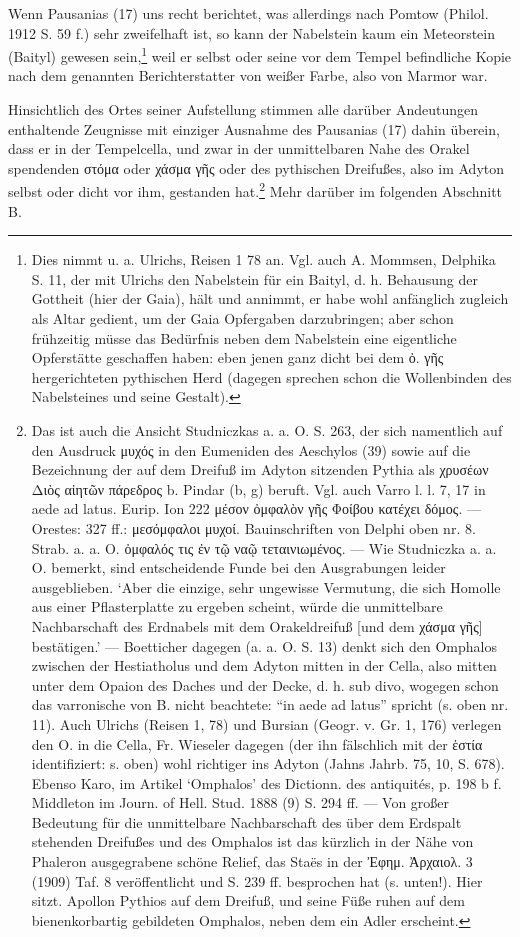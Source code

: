 \documentclass[a4paper, 11pt, oneside]{article}
\begin{document}
Wenn Pausanias (17) uns recht berichtet, was allerdings nach Pomtow (Philol. 1912 S. 59 f.) sehr zweifelhaft ist, so kann der Nabelstein kaum ein Meteorstein (Baityl) gewesen sein,\footnote{Dies nimmt u. a. Ulrichs, Reisen 1 78 an. Vgl. auch A. Mommsen, Delphika S. 11, der mit Ulrichs den Nabelstein für ein Baityl, d. h. Behausung der Gottheit (hier der Gaia), hält und annimmt, er habe wohl anfänglich zugleich als Altar gedient, um der Gaia Opfergaben darzubringen; aber schon frühzeitig müsse das Bedürfnis neben dem Nabelstein eine eigentliche Opferstätte geschaffen haben: eben jenen ganz dicht bei dem ὀ. γῆς hergerichteten pythischen Herd (dagegen sprechen schon die Wollenbinden des Nabelsteines und seine Gestalt).} weil er selbst oder seine vor dem Tempel befindliche Kopie nach dem genannten Berichterstatter von weißer Farbe, also von Marmor war.

Hinsichtlich des Ortes seiner Aufstellung stimmen alle darüber Andeutungen enthaltende Zeugnisse mit einziger Ausnahme des Pausanias (17) dahin überein, dass er in der Tempelcella, und zwar in der unmittelbaren Nahe des Orakel spendenden στόμα oder χάσμα γῆς oder des pythischen Dreifußes, also im Adyton selbst oder dicht vor ihm, gestanden hat.\footnote{Das ist auch die Ansicht Studniczkas a. a. O. S. 263, der sich namentlich auf den Ausdruck μυχός in den Eumeniden des Aeschylos (39) sowie auf die Bezeichnung der auf dem Dreifuß im Adyton sitzenden Pythia als χρυσέων Διὸς αἰητῶν πάρεδρος b. Pindar (b, g) beruft. Vgl. auch Varro l. l. 7, 17 in aede ad latus. Eurip. Ion 222 μέσον ὀμφαλὸν γῆς Φοίβου κατέχει δόμος. --- Orestes: 327 ff.: μεσόμφαλοι μυχοί. Bauinschriften von Delphi oben nr. 8. Strab. a. a. O. ὀμφαλός τις ἐν τῷ ναῷ τεταινιωμένος. --- Wie Studniczka a. a. O. bemerkt, sind entscheidende Funde bei den Ausgrabungen leider ausgeblieben. `Aber die einzige, sehr ungewisse Vermutung, die sich Homolle aus einer Pflasterplatte zu ergeben scheint, würde die unmittelbare Nachbarschaft des Erdnabels mit dem Orakeldreifuß [und dem χάσμα γῆς] bestätigen.' --- Boetticher dagegen (a. a. O. S. 13) denkt sich den Omphalos zwischen der Hestiatholus und dem Adyton mitten in der Cella, also mitten unter dem Opaion des Daches und der Decke, d. h. sub divo, wogegen schon das varronische von B. nicht beachtete: "`in aede ad latus"' spricht (s. oben nr. 11). Auch Ulrichs (Reisen 1, 78) und Bursian (Geogr. v. Gr. 1, 176) verlegen den O. in die Cella, Fr. Wieseler dagegen (der ihn fälschlich mit der ἑστία identifiziert: s. oben) wohl richtiger ins Adyton (Jahns Jahrb. 75, 10, S. 678). Ebenso Karo, im Artikel `Omphalos' des Dictionn. des antiquités, p. 198 b f. Middleton im Journ. of Hell. Stud. 1888 (9) S. 294 ff. --- Von großer Bedeutung für die unmittelbare Nachbarschaft des über dem Erdspalt stehenden Dreifußes und des Omphalos ist das kürzlich in der Nähe von Phaleron ausgegrabene schöne Relief, das Staës in der Ἐφημ. Ἀρχαιολ. 3 (1909) Taf. 8 veröffentlicht und S. 239 ff. besprochen hat (s. unten!). Hier sitzt. Apollon Pythios auf dem Dreifuß, und seine Füße ruhen auf dem bienenkorbartig gebildeten Omphalos, neben dem ein Adler erscheint.} Mehr darüber im folgenden Abschnitt B.
\end{document}
